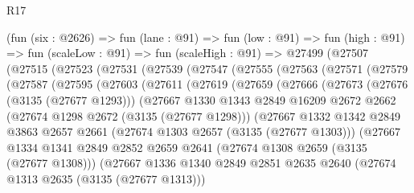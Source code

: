 \begin{lexlean}{R17}
\begin{coremodule}
    (fun (six : @2626) =>
    fun (lane : @91) =>
    fun (low : @91) =>
    fun (high : @91) =>
    fun (scaleLow : @91) =>
    fun (scaleHigh : @91) =>
    @27499
      (@27507
        (@27515
          (@27523
            (@27531
              (@27539
                (@27547
                  (@27555
                    (@27563
                      (@27571
                        (@27579
                          (@27587
                            (@27595
                              (@27603
                                (@27611
                                  (@27619
                                    (@27659
                                      (@27666
                                        (@27673
                                          (@27676 (@3135 (@27677 @1293)))
                                          (@27667
                                            @1330
                                            @1343
                                            @2849
                                            @16209
                                            @2672
                                            @2662
                                            (@27674 @1298 @2672 (@3135 (@27677 @1298)))
                                            (@27667
                                              @1332
                                              @1342
                                              @2849
                                              @3863
                                              @2657
                                              @2661
                                              (@27674 @1303 @2657 (@3135 (@27677 @1303)))
                                              (@27667
                                                @1334
                                                @1341
                                                @2849
                                                @2852
                                                @2659
                                                @2641
                                                (@27674 @1308 @2659 (@3135 (@27677 @1308)))
                                                (@27667
                                                  @1336
                                                  @1340
                                                  @2849
                                                  @2851
                                                  @2635
                                                  @2640
                                                  (@27674 @1313 @2635 (@3135 (@27677 @1313)))

\end{coremodule}
\end{lexlean}
